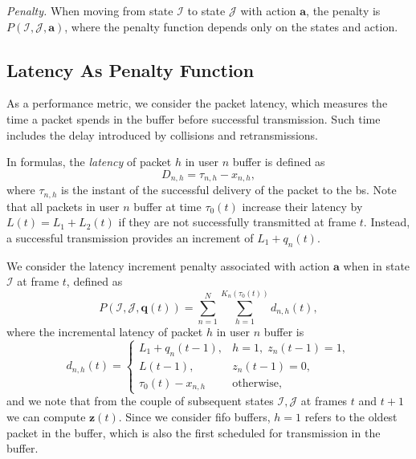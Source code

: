 \documentclass[conference]{IEEEtran}
\begin{document}
\vspace{5pt}\noindent\emph{Penalty.} When moving from state $\bm{\mathcal I}$ to state $\bm{\mathcal J}$ with action $\bm{a}$, the penalty is $P(\bm{\mathcal{I}}, \bm{\mathcal{J}}, \bm{a})$, where the penalty function depends only on the states and action.

\subsection{Latency As Penalty Function}

As a performance metric, we consider the packet latency, which measures the time a packet spends in the buffer before successful transmission. Such time includes the delay introduced by collisions and retransmissions. 

In formulas, the \textit{latency} of packet $h$ in user $n$ buffer is defined as
\begin{equation}
    D_{n, h} = \tau_{n,h} - x_{n, h},
\end{equation}
where $\tau_{n,h}$ is the instant of the successful delivery of the packet to the \ac{bs}.
Note that all packets in user $n$ buffer at time $\tau_0(t)$ increase their latency by $L(t) = L_1 + L_2(t)$ if they are not successfully transmitted at frame $t$. Instead, a successful transmission provides an increment of $L_1 +q_n(t)$. 

We consider the latency increment penalty associated with action $\bm{a}$ when in state $\bm{\mathcal{I}}$ at frame $t$, defined as 
\begin{equation}
    P(\bm{\mathcal I}, \bm{\mathcal J}, \bm{q}(t)) = \sum_{n = 1}^{N}\sum_{h = 1}^{K_n(\tau_0(t))}d_{n, h}(t),
\end{equation}
where the incremental latency of packet $h$ in user $n$ buffer is 
\begin{equation}
    d_{n, h}(t) =
    \begin{cases}
        L_1 + q_n(t-1), &  h=1,\;z_n(t-1) = 1,\\
        L(t-1), &  z_n(t-1) = 0,\\
        \tau_0(t) - x_{n,h}& \text{otherwise},
    \end{cases}
\end{equation}
and we note that from the couple of subsequent states $\bm{\mathcal I}, \bm{\mathcal J}$ at frames $t$ and $t+1$ we can compute $\bm{z}(t)$. Since we consider \ac{fifo} buffers, $h = 1$ refers to the oldest packet in the buffer, which is also the first scheduled for transmission in the buffer.
\end{document}
